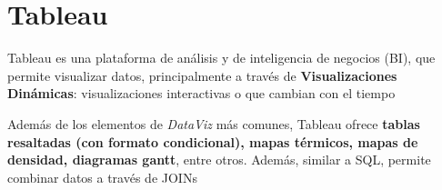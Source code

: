 
\section{Tableau}
Tableau es una plataforma de análisis y de inteligencia de negocios (BI), que permite visualizar datos, principalmente a través de \textbf{Visualizaciones Dinámicas}: visualizaciones interactivas o que cambian con el tiempo

Además de los elementos de \textit{DataViz} más comunes, Tableau ofrece \textbf{tablas resaltadas (con formato condicional), mapas térmicos, mapas de densidad, diagramas gantt}, entre otros. Además, similar a SQL, permite combinar datos a través de JOINs

\newpage